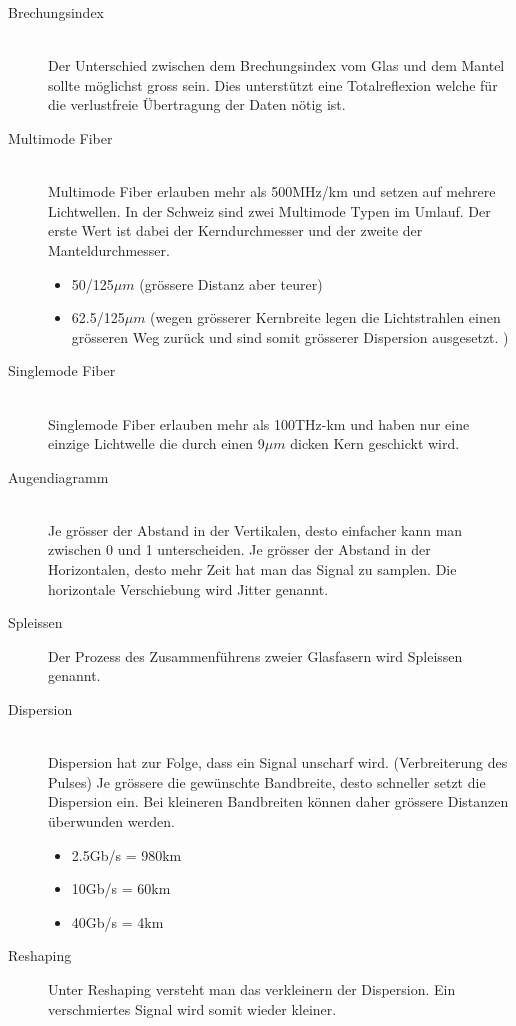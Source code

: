 \begin{description}
	\item[Brechungsindex] \hfill \\
	Der Unterschied zwischen dem Brechungsindex vom Glas und dem Mantel sollte möglichst gross sein. Dies unterstützt eine Totalreflexion welche für die verlustfreie Übertragung der Daten nötig ist.
	\item[Multimode Fiber] \hfill \\
	Multimode Fiber erlauben mehr als 500MHz/km und setzen auf mehrere Lichtwellen. In der Schweiz sind zwei Multimode Typen im Umlauf. Der erste Wert ist dabei der Kerndurchmesser und der zweite der Manteldurchmesser.
	\begin{itemize}
		\item 50/125$\mu m$ (grössere Distanz aber teurer)
		\item 62.5/125$\mu m$ (wegen grösserer Kernbreite legen die Lichtstrahlen einen grösseren Weg zurück und sind somit grösserer Dispersion ausgesetzt. )
	\end{itemize}
	\item[Singlemode Fiber] \hfill \\
	Singlemode Fiber erlauben mehr als 100THz-km und haben nur eine einzige Lichtwelle die durch einen 9$\mu m$ dicken Kern geschickt wird.
	\item[Augendiagramm] \hfill \\
	Je grösser der Abstand in der Vertikalen, desto einfacher kann man zwischen 0 und 1 unterscheiden. Je grösser der Abstand in der Horizontalen, desto mehr Zeit hat man das Signal zu samplen. Die horizontale Verschiebung wird Jitter genannt.
	\item[Spleissen] Der Prozess des Zusammenführens zweier Glasfasern wird Spleissen genannt.
	\item[Dispersion] \hfill \\
	Dispersion hat zur Folge, dass ein Signal unscharf wird. (Verbreiterung des Pulses) Je grössere die gewünschte Bandbreite, desto schneller setzt die Dispersion ein. Bei kleineren Bandbreiten können daher grössere Distanzen überwunden werden.
	\begin{itemize}
		\item 2.5Gb/s = 980km
		\item 10Gb/s = 60km
		\item 40Gb/s = 4km
	\end{itemize}
	\item[Reshaping] Unter Reshaping versteht man das verkleinern der Dispersion. Ein verschmiertes Signal wird somit wieder kleiner.

\end{description}
